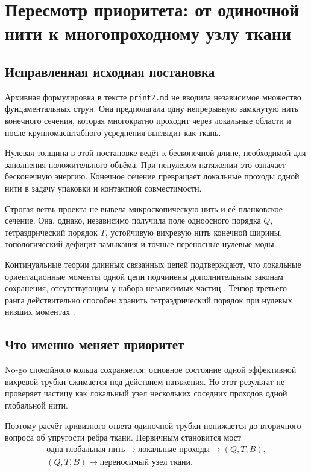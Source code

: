\chapter{Пересмотр приоритета: от одиночной нити к многопроходному узлу ткани}
\label{ch:v6-single-thread-fabric-reprioritization-gate}

\section{Исправленная исходная постановка}

Архивная формулировка в тексте \texttt{print2.md} не вводила независимое
множество фундаментальных струн. Она предполагала
одну непрерывную замкнутую нить конечного сечения, которая многократно
проходит через локальные области и после крупномасштабного усреднения
выглядит как ткань.

Нулевая толщина в этой постановке ведёт к бесконечной длине, необходимой
для заполнения положительного объёма. При ненулевом натяжении это означает
бесконечную энергию. Конечное сечение превращает локальные проходы одной
нити в задачу упаковки и контактной совместимости.

Строгая ветвь проекта не вывела микроскопическую нить и её планковское
сечение. Она, однако, независимо получила поле одноосного порядка $Q$,
тетраэдрический порядок $T$, устойчивую вихревую нить конечной ширины,
топологический дефицит замыкания и точные переносные нулевые моды.

Континуальные теории длинных связанных цепей подтверждают, что локальные
ориентационные моменты одной цепи подчинены дополнительным законам
сохранения, отсутствующим у набора независимых частиц
\cite{single-thread-moment-svensek2013,single-thread-moment-svensek2016}.
Тензор третьего ранга действительно способен хранить тетраэдрический
порядок при нулевых низших моментах
\cite{single-thread-moment-radzihovsky2000,single-thread-moment-lubensky2002}.

\section{Что именно меняет приоритет}

No-go спокойного кольца сохраняется: основное состояние одной эффективной
вихревой трубки сжимается под действием натяжения. Но этот результат не
проверяет частицу как локальный узел нескольких соседних проходов одной
глобальной нити.

Поэтому расчёт кривизного ответа одиночной трубки понижается до вторичного
вопроса об упругости ребра ткани. Первичным становится мост
\begin{equation}
 \begin{gathered}
  \text{одна глобальная нить}
  \longrightarrow \text{локальные проходы}
  \longrightarrow (Q,T,B),\\
  (Q,T,B)\longrightarrow \text{переносимый узел ткани}.
 \end{gathered}
\end{equation}

